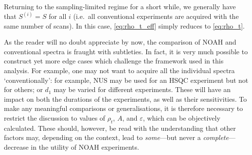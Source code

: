 Returning to the sampling-limited regime for a short while, we generally have that $S^{(i)} = S$ for all $i$ (i.e.\ all conventional experiments are acquired with the same number of scans).
In this case, \cref{eq:rho_t_eff} simply reduces to \cref{eq:rho_t}.

As the reader will no doubt appreciate by now, the comparison of NOAH and conventional spectra is fraught with subtleties.
In fact, it is very much possible to construct yet more edge cases which challenge the framework used in this analysis.
For example, one may not want to acquire all the individual spectra `conventionally': for example, NUS may be used for an HSQC experiment but not for others; or $d_1$ may be varied for different experiments.
These will have an impact on both the durations of the experiments, as well as their sensitivities.
To make any meaningful comparisons or generalisations, it is therefore necessary to restrict the discussion to values of $\rho_t$, $A$, and $\varepsilon$, which can be objectively calculated.
These should, however, be read with the understanding that other factors may, depending on the context, lead to \textit{some}---but never a \textit{complete}---decrease in the utility of NOAH experiments.
